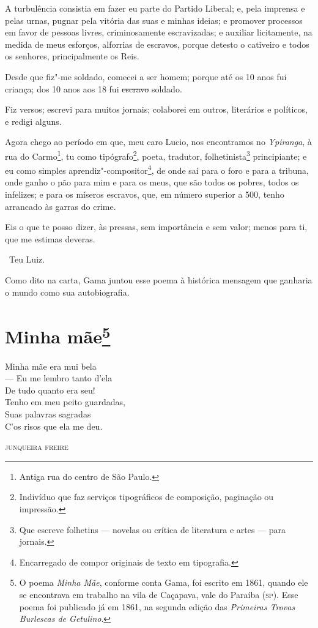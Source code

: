 A turbulência consistia em fazer eu parte do Partido Liberal; e, pela
imprensa e pelas urnas, pugnar pela vitória das suas e minhas ideias; e
promover processos em favor de pessoas livres, criminosamente
escravizadas; e auxiliar licitamente, na medida de meus esforços,
alforrias de escravos, porque detesto o cativeiro e todos os senhores,
principalmente os Reis.

Desde que fiz"-me soldado, comecei a ser homem; porque até os 10 anos fui
criança; dos 10 anos aos 18 fui \sout{escravo} soldado.

Fiz versos; escrevi para muitos jornais; colaborei em outros, literários
e políticos, e redigi alguns.

Agora chego ao período em que, meu caro Lucio, nos encontramos no
\emph{Ypiranga}, à rua do Carmo\footnote{Antiga rua do centro de São
  Paulo.}, tu como tipógrafo\footnote{Indivíduo que faz serviços
  tipográficos de composição, paginação ou impressão.}, poeta, tradutor,
folhetinista\footnote{Que escreve folhetins --- novelas ou crítica de
  literatura e artes --- para jornais.} principiante; e eu como simples
aprendiz"-compositor\footnote{Encarregado de compor originais de texto
  em tipografia.}, de onde
saí para o foro e para a tribuna, onde ganho o pão para mim e para os
meus, que são todos os pobres, todos os infelizes; e para os míseros
escravos, que, em número superior a 500, tenho arrancado às garras do
crime.

Eis o que te posso dizer, às pressas, sem importância e sem valor; menos
para ti, que me estimas deveras.

\bigskip

\hfill\ Teu Luiz.

\pagebreak
\mbox{}\vfill
\thispagestyle{empty}

{\small\noindent
Como dito na carta, Gama juntou esse poema à histórica mensagem
que ganharia o mundo como sua autobiografia. }

\chapter{Minha mãe\footnote[*]{O poema \emph{Minha Mãe}, conforme
  conta Gama, foi escrito em 1861, quando ele se encontrava em trabalho
  na vila de Caçapava, vale do Paraíba (\textsc{sp}). Esse poema foi publicado já
  em 1861, na segunda edição das \emph{Primeiras Trovas Burlescas de
  Getulino}.}}

{\setlength{\epigraphwidth}{.45\textwidth}
\epigraph{Minha mãe era mui bela\\
--- Eu me lembro tanto d'ela\\
De tudo quanto era seu!\\
Tenho em meu peito guardadas,\\
Suas palavras sagradas\\
C'os risos que ela me deu.}{\textsc{junqueira freire}\footnotemark}}


